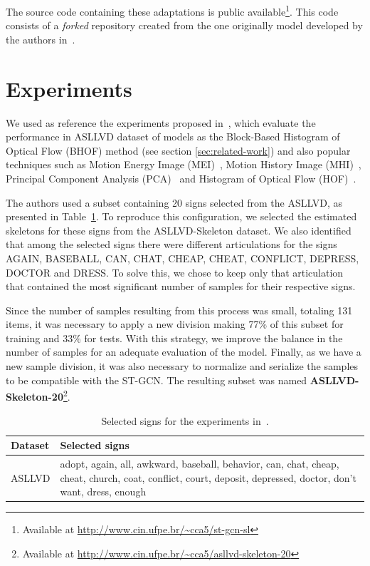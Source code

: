 The source code containing these adaptations is public available\footnote{
    Available at \url{http://www.cin.ufpe.br/~cca5/st-gcn-sl}
}. This code consists of a \textit{forked} repository created from the one originally model developed by the authors in~\cite{st-gcn-2018}.


\section{Experiments} 
\label{sec:experiments}

We used as reference the experiments proposed in~\cite{lim-2016}, which evaluate the performance in ASLLVD dataset of models as the Block-Based Histogram of Optical Flow (BHOF) method (see section \ref{sec:related-work}) and also popular techniques such as Motion Energy Image (MEI)~\cite{athitsos-asllvd-2008}, Motion History Image (MHI)~\cite{babu-2004}, Principal Component Analysis (PCA)~\cite{dreuw-2012} and Histogram of Optical Flow (HOF)~\cite{laptev-2008}.

The authors used a subset containing 20 signs selected from the ASLLVD, as presented in Table~\ref{tab:asllvd-20}. To reproduce this configuration, we selected the estimated skeletons for these signs from the ASLLVD-Skeleton dataset. 
We also identified that among the selected signs there were different articulations for the signs AGAIN, BASEBALL, CAN, CHAT, CHEAP, CHEAT, CONFLICT, DEPRESS, DOCTOR and DRESS. To solve this, we chose to keep only that articulation that contained the most significant number of samples for their respective signs.

Since the number of samples resulting from this process was small, totaling 131 items, it was necessary to apply a new division making 77\% of this subset for training and 33\% for tests. With this strategy, we improve the balance in the number of samples for an adequate evaluation of the model. Finally, as we have a new sample division, it was also necessary to normalize and serialize the samples to be compatible with the ST-GCN. 
The resulting subset was named \textbf{ASLLVD-Skeleton-20}\footnote{ Available at \url{http://www.cin.ufpe.br/~cca5/asllvd-skeleton-20} }.

\begin{table}[ht]
\centering
\caption{Selected signs for the experiments in~\cite{lim-2016}.}
\label{tab:asllvd-20}
\begin{tabular}{ l | p{} }
\hline
Dataset & Selected signs \\ \hline
ASLLVD & adopt, again, all, awkward, baseball, behavior, can, chat, cheap, cheat, church, coat, conflict, court, deposit, depressed, doctor, don’t want, dress, enough \\ \hline
\end{tabular}
\end{table}

